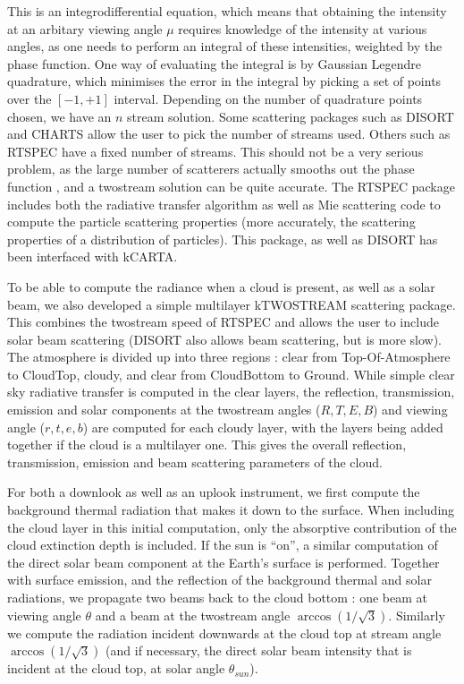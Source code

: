 \documentclass[12pt]{article}
\begin{document}
{{{{This is an integrodifferential equation, which means that obtaining
the intensity at an arbitary viewing angle $\mu$ requires knowledge of the 
intensity at various angles, as one needs to perform an integral of these
intensities, weighted by the phase function. One way of evaluating the 
integral is by
Gaussian Legendre quadrature, which minimises the error in the integral by
picking a set of points over the $[-1,+1]$ interval. Depending on the number
of quadrature points chosen, we have an $n$ stream solution. Some scattering
packages such as \textsf{DISORT} and \textsf{CHARTS} allow the user to pick
the number of streams used. Others such as \textsf{RTSPEC} have a fixed 
number of streams. This should not be a very serious problem, as the large 
number of scatterers actually smooths out the phase function \cite{dee:98}, 
and a twostream solution can be quite accurate. The \textsf{RTSPEC} package
includes both the radiative transfer algorithm as well as Mie scattering code
to compute the particle scattering properties (more accurately, the scattering
properties of a distribution of particles). This package, as well as 
\textsf{DISORT} has been interfaced with \textsf{kCARTA}. 

To be able to compute the radiance when a cloud is present, as well as a 
solar beam, we also developed a simple multilayer \textsf{kTWOSTREAM} 
scattering package. This combines the twostream speed of \textsf{RTSPEC} and 
allows the user to include solar beam scattering (\textsf{DISORT} also allows
beam scattering, but is more slow). The atmosphere is divided up into three 
regions : clear from 
Top-Of-Atmosphere to CloudTop, cloudy, and clear from CloudBottom to Ground.
While simple clear sky radiative transfer is computed in the clear layers, the
reflection, transmission, emission and solar components at the twostream 
angles ($R,T,E,B$) and viewing angle ($r,t,e,b$) are computed for each cloudy
layer, with the layers being added together if the cloud is a multilayer one.
This gives the overall reflection, transmission, emission and beam 
scattering parameters of the cloud.
 
For both a downlook as well as an uplook instrument, we first compute the 
background thermal radiation that makes it down to the surface. 
When including the cloud layer in this initial computation, only the 
absorptive contribution of the cloud extinction depth is included. If the sun
is ``on'', a similar computation of the direct solar beam component at the
Earth's surface is performed. Together with surface emission, and the 
reflection of the background thermal and solar radiations, we propagate two 
beams back to the cloud bottom : one beam at viewing angle $\theta$ and a 
beam at the twostream angle $\arccos(1/\sqrt3)$. Similarly we compute the 
radiation incident downwards at the cloud top at stream angle 
$\arccos(1/\sqrt3)$ (and if necessary, the direct solar beam intensity that 
is incident at the cloud top, at solar angle $\theta_{sun}$). 

}}}}
\end{document}
